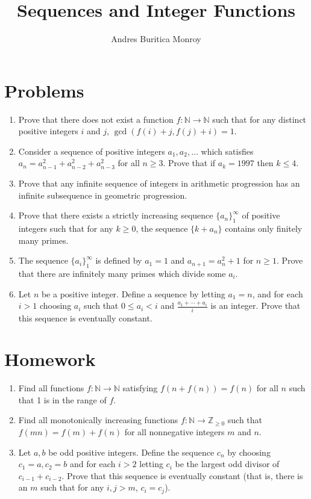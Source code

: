 \documentclass{article}
\title{Sequences and Integer Functions}
\author{Andres Buritica Monroy}
\date{}
\newcommand\Nn{\mathbb{N}}
\newcommand\Zz{\mathbb{Z}}
\begin{document}
\maketitle
\section{Problems}
\begin{enumerate}
	\item Prove that there does not exist a function $f:\Nn\to\Nn$
	      such that for any distinct positive integers $i$ and $j$,
	      $\gcd(f(i)+j,f(j)+i)=1$.
	\item Consider a sequence of positive integers $a_1,a_2,\ldots$ which satisfies
	      $a_n=a_{n-1}^2+a_{n-2}^2+a_{n-3}^2$ for all $n\ge 3$. Prove that if
	      $a_k=1997$ then $k\le 4$.
	\item Prove that any infinite sequence of integers in arithmetic progression has an
	      infinite subsequence in geometric progression.
	\item Prove that there exists a strictly increasing sequence $\{a_n\}_1^\infty$
	      of positive integers such that for any $k\ge 0$, the sequence $\{k+a_n\}$
	      contains only finitely many primes.
	\item The sequence $\{a_i\}_1^\infty$ is defined by $a_1 = 1$ and
	      $a_{n+1}=a_n^2+1$ for $n\ge 1$. Prove that there are infinitely many primes
	      which divide some $a_i$.
	\item Let $n$ be a positive integer. Define a sequence by letting $a_1=n$, and
	      for each $i>1$ choosing $a_i$ such that $0\le a_i<i$ and
	      $\frac{a_1+\cdots+a_i}i$ is an integer. Prove that this sequence is
	      eventually constant.
\end{enumerate}
\newpage
\section{Homework}
\begin{enumerate}
	\item Find all functions $f:\Nn\to\Nn$ satisfying $f(n+f(n))=f(n)$ for all
	      $n$ such that 1 is in the range of $f$.
	\item Find all monotonically increasing functions $f:\Nn\to\Zz_{\ge 0}$ such that $f(mn)=f(m)+f(n)$ for
	      all nonnegative integers $m$ and $n$.
	\item Let $a,b$ be odd positive integers. Define the sequence $c_n$ by
	      choosing $c_1=a,c_2=b$ and for each $i>2$ letting $c_i$ be the largest odd
	      divisor of $c_{i-1}+c_{i-2}$. Prove that this sequence is eventually
	      constant
	      (that is, there is an $m$ such that for any $i,j>m$, $c_i=c_j$).
\end{enumerate}
\end{document}
